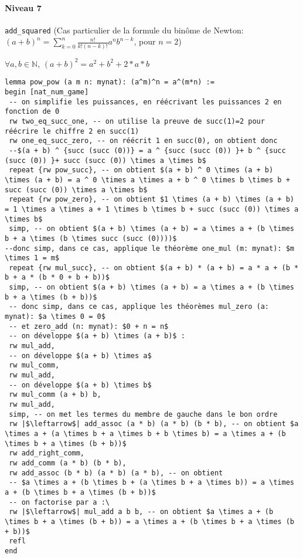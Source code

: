 \paragraph{Niveau 7} \texttt{add\_squared} (Cas particulier de la formule du binôme de Newton: $(a+b)^n=\sum_{k=0}^{n}{\frac{n!}{k!(n-k)!} a^nb^{n-k}}$, pour $n=2$)
\begin{center} $\forall a, b \in \mathbb{N}$, $(a+b)^2=a^2+b^2+2*a*b $\end{center}
\begin{verbatim}
lemma pow_pow (a m n: mynat): (a^m)^n = a^(m*n) :=
begin [nat_num_game]
 -- on simplifie les puissances, en réécrivant les puissances 2 en fonction de 0 
 rw two_eq_succ_one, -- on utilise la preuve de succ(1)=2 pour réécrire le chiffre 2 en succ(1)
 rw one_eq_succ_zero, -- on réécrit 1 en succ(0), on obtient donc 
 --$(a + b) ^ {succ (succ (0))} = a ^ {succ (succ (0)) }+ b ^ {succ (succ (0)) }+ succ (succ (0)) \times a \times b$
 repeat {rw pow_succ}, -- on obtient $(a + b) ^ 0 \times (a + b) \times (a + b) = a ^ 0 \times a \times a + b ^ 0 \times b \times b + succ (succ (0)) \times a \times b$ 
 repeat {rw pow_zero}, -- on obtient $1 \times (a + b) \times (a + b) = 1 \times a \times a + 1 \times b \times b + succ (succ (0)) \times a \times b$
 simp, -- on obtient $(a + b) \times (a + b) = a \times a + (b \times b + a \times (b \times succ (succ (0))))$
--donc simp, dans ce cas, applique le théorème one_mul (m: mynat): $m \times 1 = m$
 repeat {rw mul_succ}, -- on obtient $(a + b) * (a + b) = a * a + (b * b + a * (b * 0 + b + b))$
 simp, -- on obtient $(a + b) \times (a + b) = a \times a + (b \times b + a \times (b + b))$
 -- donc simp, dans ce cas, applique les théorèmes mul_zero (a: mynat): $a \times 0 = 0$ 
 -- et zero_add (n: mynat): $0 + n = n$
 -- on développe $(a + b) \times (a + b)$ :
 rw mul_add,
 -- on développe $(a + b) \times a$ 
 rw mul_comm,
 rw mul_add,
 -- on développe $(a + b) \times b$ 
 rw mul_comm (a + b) b,
 rw mul_add,
 simp, -- on met les termes du membre de gauche dans le bon ordre 
 rw |$\leftarrow$| add_assoc (a * b) (a * b) (b * b), -- on obtient $a \times a + (a \times b + a \times b + b \times b) = a \times a + (b \times b + a \times (b + b))$
 rw add_right_comm,
 rw add_comm (a * b) (b * b),
 rw add_assoc (b * b) (a * b) (a * b), -- on obtient 
 -- $a \times a + (b \times b + (a \times b + a \times b)) = a \times a + (b \times b + a \times (b + b))$
 -- on factorise par a :\
 rw |$\leftarrow$| mul_add a b b, -- on obtient $a \times a + (b \times b + a \times (b + b)) = a \times a + (b \times b + a \times (b + b))$
 refl
end
\end{verbatim}

